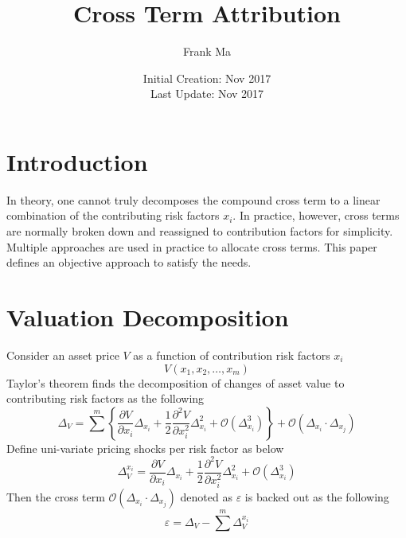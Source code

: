 \documentclass{article}
\title{Cross Term Attribution}
\author{Frank Ma}
\date{Initial Creation: Nov 2017 \\ Last Update: Nov 2017}
\begin{document}
\maketitle


\section{Introduction}
In theory, one cannot truly decomposes the compound cross term to a linear combination of the contributing risk factors $ x_i $. In practice, however, cross terms are normally broken down and reassigned to contribution factors for simplicity. Multiple approaches are used in practice to allocate cross terms. This paper defines an objective approach to satisfy the needs.


\section{Valuation Decomposition}
Consider an asset price $ V $ as a function of contribution risk factors $ x_i $
\begin{equation}
    V(x_1, x_2, \dots, x_m)
\end{equation}
Taylor's theorem finds the decomposition of changes of asset value to contributing risk factors as the following
\begin{equation}
    \Delta_V = \sum^m{\left\{\frac{\partial V}{\partial x_i} \Delta_{x_i} + \frac{1}{2} \frac{\partial^2 V}{\partial x_i^2} \Delta_{x_i}^2 + \mathcal{O}\left(\Delta_{x_i}^3\right)\right\} + \mathcal{O}\left(\Delta_{x_i} \cdot \Delta_{x_j}\right)}
\end{equation}
Define uni-variate pricing shocks per risk factor as below
\begin{equation}
    \Delta_V^{x_i} = \frac{\partial V}{\partial x_i} \Delta_{x_i} + \frac{1}{2} \frac{\partial^2 V}{\partial x_i^2} \Delta_{x_i}^{2} + \mathcal{O}\left(\Delta_{x_i}^{3}\right)
\end{equation}
Then the cross term $ \mathcal{O}\left(\Delta_{x_i} \cdot \Delta_{x_j}\right) $ denoted as $ \varepsilon $ is backed out as the following
\begin{equation}
    \varepsilon = \Delta_V - \sum^m{\Delta_V^{x_i}}
\end{equation}
\end{document}
